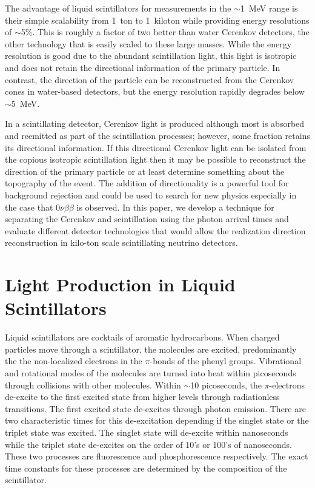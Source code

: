 \documentclass[aps,prc,twocolumn,groupedaddress,showpacs,amsmath,amssymb,floatfix,superscriptaddress]{revtex4}
\begin{document}
The advantage of liquid scintillators for measurements in the $\sim$1~MeV range is their simple scalability from  1~ton to 1~kiloton while providing energy resolutions of $\sim$5\%. This is roughly a factor of two better than water Cerenkov detectors, the other technology that is easily scaled to these  large masses. While the energy resolution is good due to the abundant scintillation light, this light is isotropic and does not retain the directional information of the primary particle.   In contrast, the direction of the particle can be reconstructed from the Cerenkov cones in water-based detectors, but the energy resolution rapidly degrades below $\sim$5~MeV.

In a scintillating detector, Cerenkov light is produced although most is absorbed and reemitted as part of the scintillation processes; however, some fraction retains its directional information. If this directional Cerenkov light can be isolated from the copious isotropic scintillation light then it may be possible to reconstruct the direction of the primary particle or at least determine something about the topography of the event. The addition of directionality is a powerful tool for background rejection and could be used to search for new physics especially in the case that $0\nu\beta\beta$ is observed. In this paper, we develop a technique for separating the Cerenkov and scintillation using the photon arrival times and evaluate different detector technologies that would allow the realization direction reconstruction in kilo-ton scale scintillating neutrino detectors.


\section{Light Production in Liquid Scintillators}
Liquid scintillators are cocktails of aromatic hydrocarbons. When charged particles move through a scintillator, the molecules are excited, predominantly the the non-localized electrons in the $\pi$-bonds of the phenyl groups. Vibrational and rotational modes of the molecules are turned into heat within picoseconds through collisions with other molecules.  Within $\sim$10 picoseconds, the $\pi$-electrons de-excite to the first excited state from higher levels through radiationless transitions. The first excited state de-excites through photon emission. There are two characteristic times for this de-excitation depending if the singlet state or the triplet state was excited.  The singlet state will de-excite within nanoseconds while the triplet state de-excites on the order of 10's or 100's of nanoseconds. These two processes are fluorescence and phosphorescence respectively. The exact time constants for these processes are determined by the composition of the scintillator.
\end{document}
